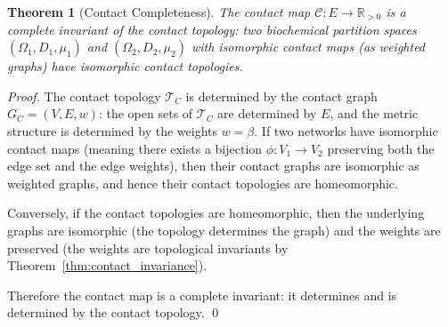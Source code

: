 \documentclass[11pt,twocolumn]{article}
\theoremstyle{plain}
\newtheorem{theorem}{Theorem}[section]
\theoremstyle{definition}
\newcommand{\CC}{\mathcal{C}}
\newcommand{\reals}{\mathbb{R}}
\begin{document}
\begin{theorem}[Contact Completeness]
\label{thm:contact_completeness}
The contact map $\CC: E \to \reals_{>0}$ is a complete invariant of the
contact topology: two biochemical partition spaces $(\Omega_1, D_1, \mu_1)$ and
$(\Omega_2, D_2, \mu_2)$ with isomorphic contact maps (as weighted graphs)
have isomorphic contact topologies.
\end{theorem}

\begin{proof}
The contact topology $\mathcal{T}_C$ is determined by the contact graph
$G_C = (V, E, w)$: the open sets of $\mathcal{T}_C$ are determined by $E$, and
the metric structure is determined by the weights $w = \beta$. If two networks
have isomorphic contact maps (meaning there exists a bijection $\phi: V_1 \to
V_2$ preserving both the edge set and the edge weights), then their contact
graphs are isomorphic as weighted graphs, and hence their contact topologies are
homeomorphic.

Conversely, if the contact topologies are homeomorphic, then the underlying
graphs are isomorphic (the topology determines the graph) and the weights
are preserved (the weights are topological invariants by
Theorem~\ref{thm:contact_invariance}).

Therefore the contact map is a complete invariant: it determines and is
determined by the contact topology. \qed
\end{proof}
\end{document}
